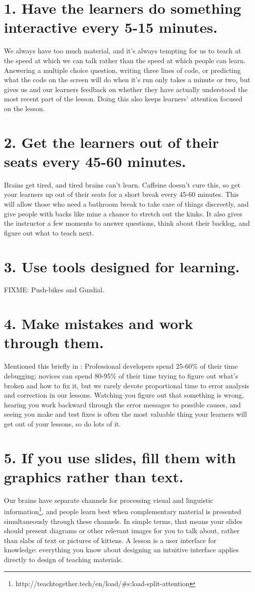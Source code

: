 \documentclass[10pt,letterpaper]{article}
\newcommand{\rulemajor}[1]{\section{#1}}
\begin{document}
\rulemajor{1. Have the learners do something interactive every 5-15 minutes.}

We always have too much material,
and it's always tempting for us to teach at the speed at which we can talk
rather than the speed at which people can learn.
Answering a multiple choice question,
writing three lines of code,
or predicting what the code on the screen will do when it's run only takes a minute or two,
but gives us and our learners feedback on whether they have actually understood the most recent part of the lesson.
Doing this also keeps learners' attention focused on the lesson.

\rulemajor{2. Get the learners out of their seats every 45-60 minutes.}

Brains get tired, and tired brains can't learn.
Caffeine doesn't cure this,
so get your learners up out of their seats for a short break every 45-60 minutes.
This will allow those who need a bathroom break to take care of things discreetly,
and give people with backs like mine a chance to stretch out the kinks.
It also gives the instructor a few moments to answer questions,
think about their backlog,
and figure out what to teach next.

\rulemajor{3. Use tools designed for learning.}

FIXME: Push-bikes and Guzdial.

\rulemajor{4. Make mistakes and work through them.}

Mentioned this briefly in \cite{Brow2018}:
Professional developers spend 25-60\% of their time debugging;
novices can spend 80-95\% of their time trying to figure out what's broken and how to fix it,
but we rarely devote proportional time to error analysis and correction in our lessons.
Watching you figure out that something is wrong,
hearing you work backward through the error messages to possible causes,
and seeing you make and test fixes is often the most valuable thing your learners will get out of your lessons,
so do lots of it.

\rulemajor{5. If you use slides, fill them with graphics rather than text.}

Our brains have separate channels for
processing visual and linguistic information\footnote{http://teachtogether.tech/en/load/\#s:load-split-attention},
and people learn best when complementary material is presented simultaneously through these channels.
In simple terms,
that means your slides should present diagrams or other relevant images for you to talk about,
rather than slabs of text or pictures of kittens.
A lesson is a user interface for knowledge:
everything you know about designing an intuitive interface applies directly to design of teaching materials.
\end{document}
